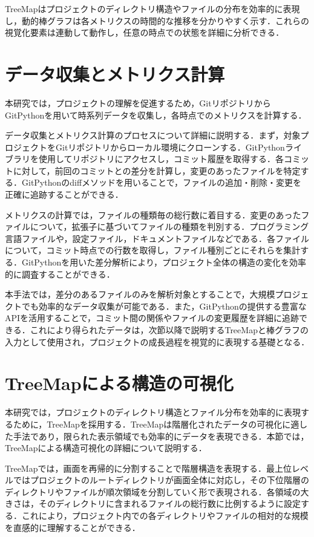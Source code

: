 \documentclass[12pt,twoside]{jbook}
\begin{document}
TreeMapはプロジェクトのディレクトリ構造やファイルの分布を効率的に表現し，動的棒グラフは各メトリクスの時間的な推移を分かりやすく示す．これらの視覚化要素は連動して動作し，任意の時点での状態を詳細に分析できる．

\section{データ収集とメトリクス計算}
本研究では，プロジェクトの理解を促進するため，GitリポジトリからGitPythonを用いて時系列データを収集し，各時点でのメトリクスを計算する．

データ収集とメトリクス計算のプロセスについて詳細に説明する．まず，対象プロジェクトをGitリポジトリからローカル環境にクローンする．GitPythonライブラリを使用してリポジトリにアクセスし，コミット履歴を取得する．各コミットに対して，前回のコミットとの差分を計算し，変更のあったファイルを特定する．GitPythonのdiffメソッドを用いることで，ファイルの追加・削除・変更を正確に追跡することができる．

メトリクスの計算では，ファイルの種類毎の総行数に着目する．変更のあったファイルについて，拡張子に基づいてファイルの種類を判別する．プログラミング言語ファイルや，設定ファイル，ドキュメントファイルなどである．各ファイルについて，コミット時点での行数を取得し，ファイル種別ごとにそれらを集計する．GitPythonを用いた差分解析により，プロジェクト全体の構造の変化を効率的に調査することができる．

本手法では，差分のあるファイルのみを解析対象とすることで，大規模プロジェクトでも効率的なデータ収集が可能である．また，GitPythonの提供する豊富なAPIを活用することで，コミット間の関係やファイルの変更履歴を詳細に追跡できる．これにより得られたデータは，次節以降で説明するTreeMapと棒グラフの入力として使用され，プロジェクトの成長過程を視覚的に表現する基礎となる．

\section{TreeMapによる構造の可視化}
本研究では，プロジェクトのディレクトリ構造とファイル分布を効率的に表現するために，TreeMapを採用する．TreeMapは階層化されたデータの可視化に適した手法であり，限られた表示領域でも効率的にデータを表現できる．本節では，TreeMapによる構造可視化の詳細について説明する．

TreeMapでは，画面を再帰的に分割することで階層構造を表現する．最上位レベルではプロジェクトのルートディレクトリが画面全体に対応し，その下位階層のディレクトリやファイルが順次領域を分割していく形で表現される．各領域の大きさは，そのディレクトリに含まれるファイルの総行数に比例するように設定する．これにより，プロジェクト内での各ディレクトリやファイルの相対的な規模を直感的に理解することができる．
\end{document}
